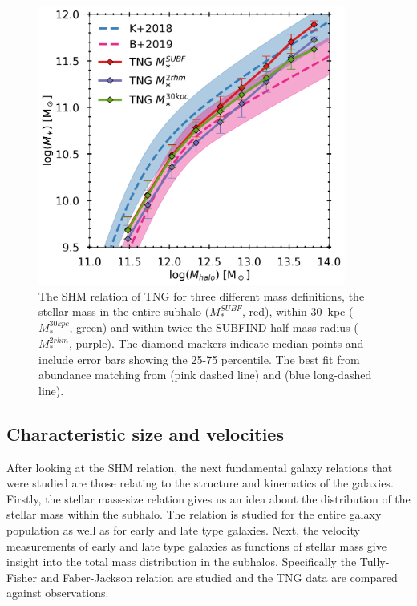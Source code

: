\begin{figure}
    \centering
    \includegraphics[width=0.9\textwidth]{images/shmr.png}
    \caption{The SHM relation of TNG for three different mass definitions, the stellar mass in the entire subhalo ($M_\ast^{SUBF}$, red), within 30$\,$ kpc ($M_\ast^{30kpc}$, green) and within twice the SUBFIND half mass radius ($M_\ast^{2rhm}$, purple). The diamond markers indicate median points and include error bars showing the 25-75 percentile. The best fit from abundance matching from \textcite{Behroozi2019} (pink dashed line) and \textcite{Kravtsov2018} (blue long-dashed line).}
    \label{shmr}
\end{figure}


\subsection{Characteristic size and velocities}
After looking at the SHM relation, the next fundamental galaxy relations that were studied are those relating to the structure and kinematics of the galaxies. Firstly, the stellar mass-size relation gives us an idea about the distribution of the stellar mass within the subhalo. The relation is studied for the entire galaxy population as well as for early and late type galaxies. Next, the velocity measurements of early and late type galaxies as functions of stellar mass give insight into the total mass distribution in the subhalos. Specifically the Tully-Fisher and Faber-Jackson relation are studied and the TNG data are compared against observations.

